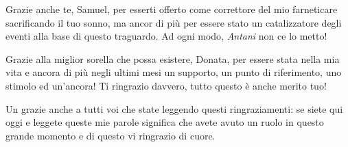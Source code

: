 Grazie anche te, Samuel, per esserti offerto come correttore del mio farneticare sacrificando il tuo sonno, ma ancor di più per essere stato un catalizzatore degli eventi alla base di questo traguardo. Ad ogni modo, \emph{Antani} non ce lo metto!

Grazie alla miglior sorella che possa esistere, Donata, per essere stata nella mia vita e ancora di più negli ultimi mesi un supporto, un punto di riferimento, uno stimolo ed un'ancora! Ti ringrazio davvero, tutto questo è anche merito tuo!

Un grazie anche a tutti voi che state leggendo questi ringraziamenti: se siete qui oggi e leggete queste mie parole significa che avete avuto un ruolo in questo grande momento e di questo vi ringrazio di cuore.
